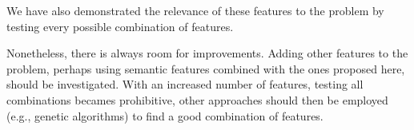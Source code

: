 We have also demonstrated the relevance of these features to the problem
by testing every possible combination of features.

Nonetheless, there is always room for improvements. Adding other features
to the problem, perhaps using semantic features combined with the ones
proposed here, should be investigated. With an increased number of features,
testing all combinations becames prohibitive, other approaches should then be
employed (e.g., genetic algorithms) to find a good combination of features.


